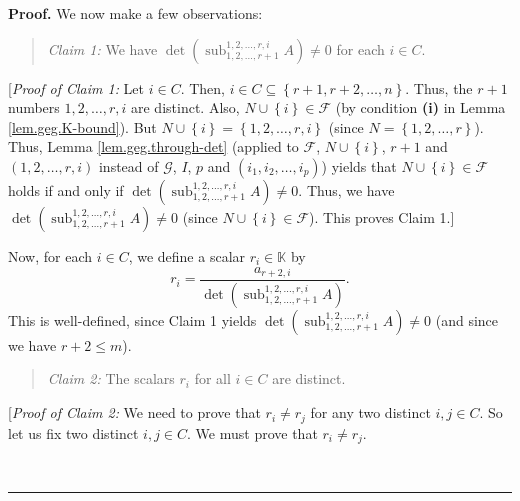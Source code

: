 \documentclass[numbers=enddot,12pt,final,onecolumn,notitlepage]{scrartcl}%
\theoremstyle{definition}
\newenvironment{statement}{\begin{quote}}{\end{quote}}
\newenvironment{proof}[1][Proof]{\noindent\textbf{#1.} }{\ \rule{0.5em}{0.5em}}
\renewcommand{\leq}{\leqslant}
\theoremstyle{plainsl}
\begin{document}
\begin{proof}
We now make a few observations:

\begin{statement}
\textit{Claim 1:} We have $\det\left(  \operatorname*{sub}%
\nolimits_{1,2,\ldots,r+1}^{1,2,\ldots,r,i}A\right)  \neq0$ for each $i\in C$.
\end{statement}

[\textit{Proof of Claim 1:} Let $i\in C$. Then, $i\in C\subseteq\left\{
r+1,r+2,\ldots,n\right\}  $. Thus, the $r+1$ numbers $1,2,\ldots,r,i$ are
distinct. Also, $N\cup\left\{  i\right\}  \in\mathcal{F}$ (by condition
\textbf{(i)} in Lemma \ref{lem.geg.K-bound}). But $N\cup\left\{  i\right\}
=\left\{  1,2,\ldots,r,i\right\}  $ (since $N=\left\{  1,2,\ldots,r\right\}
$). Thus, Lemma \ref{lem.geg.through-det} (applied to $\mathcal{F}$,
$N\cup\left\{  i\right\}  $, $r+1$ and $\left(  1,2,\ldots,r,i\right)  $
instead of $\mathcal{G}$, $I$, $p$ and $\left(  i_{1},i_{2},\ldots
,i_{p}\right)  $) yields that $N\cup\left\{  i\right\}  \in\mathcal{F}$ holds
if and only if $\det\left(  \operatorname*{sub}\nolimits_{1,2,\ldots
,r+1}^{1,2,\ldots,r,i}A\right)  \neq0.$ Thus, we have $\det\left(
\operatorname*{sub}\nolimits_{1,2,\ldots,r+1}^{1,2,\ldots,r,i}A\right)  \neq0$
(since $N\cup\left\{  i\right\}  \in\mathcal{F}$). This proves Claim 1.]
\medskip

Now, for each $i\in C$, we define a scalar $r_{i}\in\mathbb{K}$ by%
\begin{equation}
r_{i}=\dfrac{a_{r+2,i}}{\det\left(  \operatorname*{sub}\nolimits_{1,2,\ldots
,r+1}^{1,2,\ldots,r,i}A\right)  }. \label{pf.lem.geg.K-bound.1}%
\end{equation}
This is well-defined, since Claim 1 yields $\det\left(  \operatorname*{sub}%
\nolimits_{1,2,\ldots,r+1}^{1,2,\ldots,r,i}A\right)  \neq0$ (and since we have
$r+2\leq m$).

\begin{statement}
\textit{Claim 2:} The scalars $r_{i}$ for all $i\in C$ are distinct.
\end{statement}

[\textit{Proof of Claim 2:} We need to prove that $r_{i}\neq r_{j}$ for any
two distinct $i,j\in C$. So let us fix two distinct $i,j\in C$. We must prove
that $r_{i}\neq r_{j}$.


\end{proof}
\end{document}
